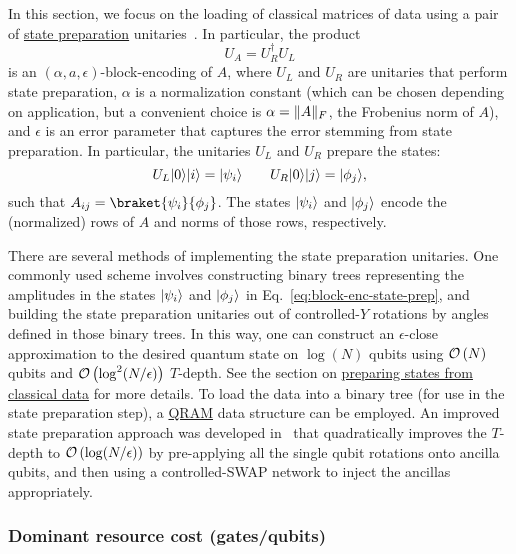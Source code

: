 \begin{refsection}
In this section, we focus on the loading of classical matrices of data using a pair of \hyperref[prim:StatePrepData]{state preparation} unitaries~\cite{gilyen2018QSingValTransfArXiv, kerenidis2016QRecSys, chakraborty2018BlockMatrixPowers}. In particular, the product
\begin{equation}
U_A=U_R^\dagger U_L
\end{equation}
is an $(\alpha,a,\epsilon)$-block-encoding of $A$, where $U_L$ and $U_R$ are unitaries that perform state preparation, $\alpha$ is a normalization constant (which can be chosen depending on application, but a convenient choice is $\alpha=\lVert A\rVert_F$, the Frobenius norm of $A$), and $\epsilon$ is an error parameter that captures the error stemming from state preparation. In particular, the unitaries $U_L$ and $U_R$ prepare the states:
\begin{equation}\label{eq:block-enc-state-prep}
U_L\lvert0\rangle\lvert i\rangle=\lvert\psi_i\rangle\qquad U_R\lvert0\rangle\lvert j\rangle=\lvert\phi_j\rangle,
\end{equation}
such that $A_{ij}=\braket{\psi_i}{\phi_j}$. The states $\lvert\psi_i\rangle$ and $\lvert\phi_j\rangle$ encode the (normalized) rows of $A$ and norms of those rows, respectively.

There are several methods of implementing the state preparation unitaries. One commonly used scheme involves constructing binary trees representing the amplitudes in the states $\lvert\psi_i\rangle$ and $\lvert\phi_j\rangle$ in Eq.~\eqref{eq:block-enc-state-prep}, and building the state preparation unitaries out of controlled-$Y$ rotations by angles defined in those binary trees. In this way, one can construct an $\epsilon$-close approximation to the desired quantum state on $\log(N)$ qubits using $\mathcal{O}\left( N \right)$ qubits and $\mathcal{O}\left( \log^2(N/\epsilon) \right)$ $T$-depth. See the section on \hyperref[prim:StatePrepData]{preparing states from classical data} for more details. To load the data into a binary tree (for use in the state preparation step), a \hyperref[prim:QRAM]{QRAM} data structure can be employed. An improved state preparation approach was developed in~\cite{clader2022resourcesForBlockEncoding} that quadratically improves the $T$-depth to $\mathcal{O}\left( \log(N/\epsilon) \right)$ by pre-applying all the single qubit rotations onto ancilla qubits, and then using a controlled-SWAP network to inject the ancillas appropriately.


\subsubsection*{Dominant resource cost (gates/qubits)}


\end{refsection}
